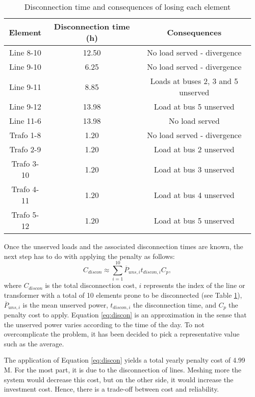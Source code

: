 \begin{table}[!htb]\centering
  \begin{tabular}[]{ccc}
    \hline 
    \textbf{Element} & \textbf{Disconnection time (h)} & \textbf{Consequences} \\
    \hline
    Line 8-10 & 12.50 & No load served - divergence \\
    Line 9-10 & 6.25 & No load served - divergence \\
    Line 9-11 & 8.85 & Loads at buses 2, 3 and 5 unserved \\
    Line 9-12 & 13.98 & Load at bus 5 unserved \\
    Line 11-6 & 13.98 & No load served \\
    Trafo 1-8 & 1.20 & No load served - divergence \\
    Trafo 2-9 & 1.20 & Load at bus 2 unserved \\
    Trafo 3-10 & 1.20 & Load at bus 3 unserved \\
    Trafo 4-11 & 1.20 & Load at bus 4 unserved \\
    Trafo 5-12 & 1.20 & Load at bus 5 unserved \\
    \hline
  \end{tabular}
  \caption{Disconnection time and consequences of losing each element}
  \label{tab:lt1}
\end{table}
Once the unserved loads and the associated disconnection times are known, the next step has to do with applying the penalty as follows:
\begin{equation}
  C_{discon} \approx \sum_{i=1}^{10} \overline{P}_{uns,i} t_{discon,i} C_p,
  \label{eq:discon}
\end{equation}
where $C_{discon}$ is the total disconnection cost, $i$ represents the index of the line or transformer with a total of 10 elements prone to be disconnected (see Table \ref{tab:lt1}), $\overline{P}_{uns,i}$ is the mean unserved power, $t_{discon,i}$ the disconnection time, and $C_p$ the penalty cost to apply. Equation \ref{eq:discon} is an approximation in the sense that the unserved power varies according to the time of the day. To not overcomplicate the problem, it has been decided to pick a representative value such as the average. 

The application of Equation \ref{eq:discon} yields a total yearly penalty cost of 4.99 M\texteuro. For the most part, it is due to the disconnection of lines. Meshing more the system would decrease this cost, but on the other side, it would increase the investment cost. Hence, there is a trade-off between cost and reliability.

